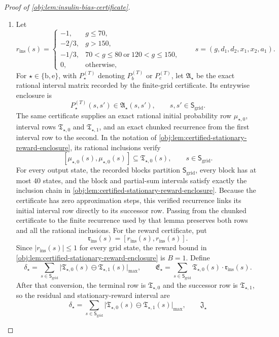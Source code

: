 \begin{proof}[Proof of \cref{obj:lem:insulin-bias-certificate}]
\begin{enumerate}
\item Let
\[
r_{\mathrm{ins}}(s)=
\begin{cases}
-1,&g\le70,\\
-2/3,&g>150,\\
-1/3,&70<g\le80\ \text{or}\ 120<g\le150,\\
0,&\text{otherwise},
\end{cases}
\qquad s=(g,d_1,d_2,x_1,x_2,a_1).
\]
For \(\star\in\{\mathrm b,\mathrm e\}\), with \(P_\star^{(T)}\) denoting \(P_b^{(T)}\) or \(P_e^{(T)}\), let \(\mathfrak A_\star\) be the exact rational interval matrix recorded by the finite-grid certificate. Its entrywise enclosure is
\[
P_\star^{(T)}(s,s')\in \mathfrak A_\star(s,s'),
\qquad s,s'\in\mathsf S_{\mathrm{grid}}.
\]
The same certificate supplies an exact rational initial probability row \(\mu_{\star,0}\), interval
rows \(\mathfrak T_{\star,0}\) and \(\mathfrak T_{\star,1}\), and an exact chunked recurrence from the
first interval row to the second. In the notation of
\cref{obj:lem:certified-stationary-reward-enclosure}, its rational inclusions verify
\[
[\mu_{\star,0}(s),\mu_{\star,0}(s)]
\subseteq
\mathfrak T_{\star,0}(s),
\qquad s\in\mathsf S_{\mathrm{grid}}.
\]
For every output state, the recorded blocks partition \(\mathsf S_{\mathrm{grid}}\), every block has at
most \(40\) states, and the block and partial-sum intervals satisfy exactly the inclusion chain in
\cref{obj:lem:certified-stationary-reward-enclosure}. Because the certificate has zero approximation
steps, this verified recurrence links its initial interval row directly to its successor row. Passing
from the chunked certificate to the finite recurrence used by that lemma preserves both rows and all
the rational inclusions. For the reward certificate, put
\[
\mathfrak r_{\mathrm{ins}}(s)=[r_{\mathrm{ins}}(s),r_{\mathrm{ins}}(s)].
\]
Since \(|r_{\mathrm{ins}}(s)|\le1\) for every grid state, the reward bound in \cref{obj:lem:certified-stationary-reward-enclosure} is \(B=1\). Define
\[
\delta_\star
=
\sum_{s\in\mathsf S_{\mathrm{grid}}}
\bigl|
\mathfrak T_{\star,0}(s)\ominus
\mathfrak T_{\star,1}(s)
\bigr|_{\max},
\qquad
\mathfrak E_\star
=
\sum_{s\in\mathsf S_{\mathrm{grid}}}
\mathfrak T_{\star,0}(s)\cdot \mathfrak r_{\mathrm{ins}}(s) .
\]
After that conversion, the terminal row is \(\mathfrak T_{\star,0}\) and the successor row is
\(\mathfrak T_{\star,1}\), so the residual and stationary-reward interval are
\[
\delta_\star
=
\sum_{s\in\mathsf S_{\mathrm{grid}}}
\bigl|
\mathfrak T_{\star,0}(s)\ominus
\mathfrak T_{\star,1}(s)
\bigr|_{\max},
\qquad
\mathfrak J_\star
\]
\end{enumerate}
\end{proof}
